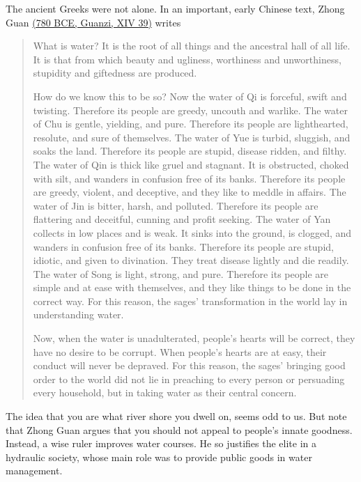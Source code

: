 The ancient Greeks were not alone. In an important, early Chinese text, Zhong Guan \href{https://books.google.co.uk/books?id=Yu7eDwAAQBAJ\&pg=PA106&lpg=PA106&dq=guanzi+greedy,+uncouth,+and+warlike\&source=bl\&ots=6eLMGGPbXp\&sig=ACfU3U1ckHgtbfjTESsSPRnWIziRpLRvIQ\&hl=en\&sa=X\&ved=2ahUKEwiDqpqljZrqAhUSZcAKHWNkCCIQ6AEwAHoECAkQAQ#v=onepage\&q=guanzi\%20greedy\%2C\%20uncouth\%2C\%20and\%20warlike\&f=false}{(780 BCE, Guanzi, XIV 39)} writes
\begin{quote}
    What is water? It is the root of all things and the ancestral hall of all life. It is that from which beauty and ugliness, worthiness and unworthiness, stupidity and giftedness are produced.
    
    How do we know this to be so? Now the water of Qi is forceful, swift and twisting. Therefore its people are greedy, uncouth and warlike. The water of Chu is gentle, yielding, and pure. Therefore its people are lighthearted, resolute, and sure of themselves. The water of Yue is turbid, sluggish, and soaks the land. Therefore its people are stupid, disease ridden, and filthy. The water of Qin is thick like gruel and stagnant. It is obstructed, choked with silt, and wanders in confusion free of its banks. Therefore its people are greedy, violent, and deceptive, and they like to meddle in affairs. The water of Jin is bitter, harsh, and polluted. Therefore its people are flattering and deceitful, cunning and profit seeking. The water of Yan collects in low places and is weak. It sinks into the ground, is clogged, and wanders in confusion free of its banks. Therefore its people are stupid, idiotic, and given to divination. They treat disease lightly and die readily. The water of Song is light, strong, and pure. Therefore its people are simple and at ease with themselves, and they like things to be done in the correct way. For this reason, the sages' transformation in the world lay in understanding water.
    
    Now, when the water is unadulterated, people's hearts will be correct, they have no desire to be corrupt. When people's hearts are at easy, their conduct will never be depraved. For this reason, the sages' bringing good order to the world did not lie in preaching to every person or persuading every household, but in taking water as their central concern.
\end{quote}
The idea that you are what river shore you dwell on, seems odd to us. But note that Zhong Guan argues that you should not appeal to people's innate goodness. Instead, a wise ruler improves water courses. He so justifies the elite in a hydraulic society, whose main role was to provide public goods in water management.

